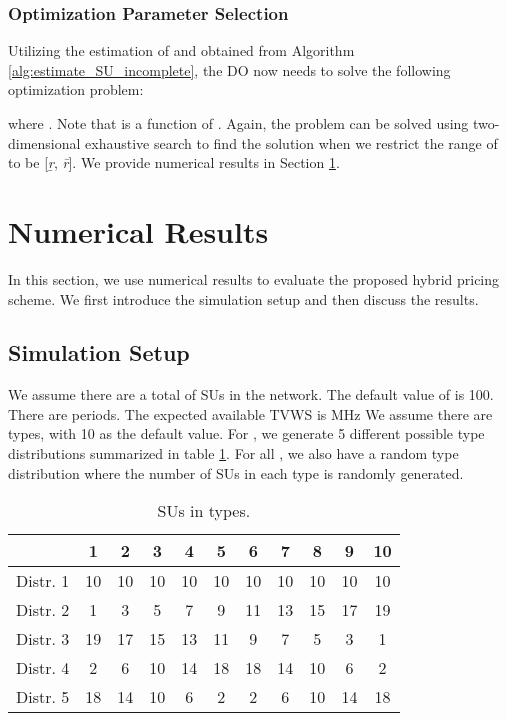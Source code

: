 \documentclass[journal]{IEEEtran}
\begin{document}
\subsubsection{Optimization Parameter Selection}

Utilizing the estimation of  and  obtained from Algorithm \ref{alg:estimate_SU_incomplete}, the DO now needs to solve the following optimization problem:

where
.
Note that  is a function of . Again, the problem can be solved using two-dimensional exhaustive search to find the solution when we restrict the range of  to be [\emph{\b{r}}, \emph{\={r}}]. We provide numerical results in Section \ref{sec:simulation}.

\section{Numerical Results}
\label{sec:simulation}

In this section, we use numerical results to evaluate the proposed hybrid pricing scheme. We first introduce the simulation setup and then discuss the results.

\subsection{Simulation Setup}

We assume there are a total of  SUs in the network. The default value of  is 100. There are  periods.
The expected available TVWS is  MHz \cite{TVWS_availability1}\cite{TVWS_availability2}
We assume there are  types, with 10 as the default value.
For , we generate 5 different possible type distributions summarized in table \ref{tab:distributions}.
For all , we also have a random type distribution where the number of SUs in each type is randomly generated.

\begin{table}[tp]
\renewcommand{\arraystretch}{0.9}
\caption{ SUs in  types.}
\label{tab:distributions}
\centering
\begin{tabular}{|c|c|c|c|c|c|c|c|c|c|c|}
  \hline
   & 1  & 2  & 3  & 4  & 5  & 6  & 7  & 8  & 9  & 10  \\
  \hline
  Distr. 1     & 10 & 10 & 10 & 10 & 10 & 10 & 10 & 10 & 10 & 10 \\
  \hline
  Distr. 2     & 1  & 3  & 5  & 7  & 9  & 11 & 13 & 15 & 17 & 19 \\
  \hline
  Distr. 3     & 19 & 17 & 15 & 13 & 11 & 9  & 7  & 5  & 3  & 1  \\
  \hline
  Distr. 4     & 2  & 6  & 10 & 14 & 18 & 18 & 14 & 10 & 6  & 2  \\
  \hline
  Distr. 5     & 18 & 14 & 10 & 6  & 2  & 2  & 6  & 10 & 14 & 18 \\
  \hline
\end{tabular}
\end{table}
\end{document}
